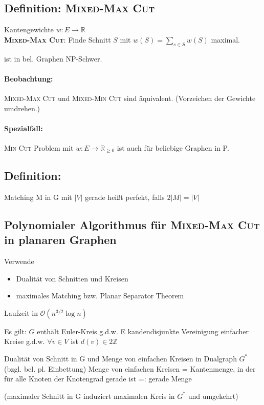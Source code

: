 \documentclass{article}
\newcommand{\df}[1]{\textbf{#1}\index{#1}}
\newcommand{\Z}{\mathbb{Z}}
\renewcommand{\O}[1]{\mathcal{O}\left(#1\right)}
\newcommand{\R}{\mathbb{R}}
\begin{document}
\subsection{Definition: \textsc{Mixed-Max Cut}}
Kantengewichte $w: E \rightarrow \R$\\
\df{\textsc{Mixed-Max Cut}}: Finde Schnitt $S$ mit $w(S) = \sum_{s\in S}w(S)$ maximal.

ist in bel. Graphen NP-Schwer.

\paragraph{Beobachtung:}
\textsc{Mixed-Max Cut} und \textsc{Mixed-Min Cut} sind äquivalent. (Vorzeichen der Gewichte umdrehen.)

\paragraph{Spezialfall:} \textsc{Min Cut} Problem mit $w:E\rightarrow \R_{\geq 0}$ ist auch für beliebige Graphen in P.

\subsection{Definition:}
Matching M in G mit $|V|$ gerade heißt perfekt, falls $2|M| = |V|$

\subsection{Polynomialer Algorithmus für \textsc{Mixed-Max Cut} in planaren Graphen}
Verwende 
\begin{itemize}
	\item Dualität von Schnitten und Kreisen
	\item maximales Matching bzw. Planar Separator Theorem
\end{itemize}
Laufzeit in $\O{n^{3/2}\log n}$


Es gilt: $G$ enthält Euler-Kreis g.d.w. E kandendisjunkte Vereinigung einfacher Kreise g.d.w. $\forall v\in V$ ist $d(v) \in 2\Z$


Dualität von Schnitt in G und Menge von einfachen Kreisen in Dualgraph $G^*$ (bzgl. bel. pl. Einbettung)
Menge von einfachen Kreisen = Kantenmenge, in der für alle Knoten der Knotengrad gerade ist =: gerade Menge

(maximaler Schnitt in G induziert maximalen Kreis in $G^*$ und umgekehrt)
\end{document}
